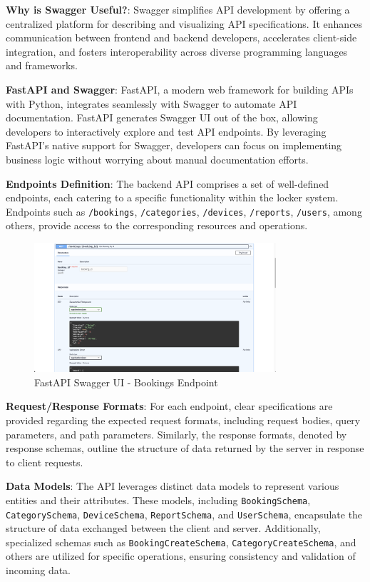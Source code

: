 \textbf{Why is Swagger Useful?}:
Swagger simplifies API development by offering a centralized platform for describing and visualizing API specifications. It enhances communication between frontend and backend developers, accelerates client-side integration, and fosters interoperability across diverse programming languages and frameworks.

\textbf{FastAPI and Swagger}:
FastAPI, a modern web framework for building APIs with Python, integrates seamlessly with Swagger to automate API documentation. FastAPI generates Swagger UI out of the box, allowing developers to interactively explore and test API endpoints. By leveraging FastAPI's native support for Swagger, developers can focus on implementing business logic without worrying about manual documentation efforts.

\textbf{Endpoints Definition}:
The backend API comprises a set of well-defined endpoints, each catering to a specific functionality within the locker system. Endpoints such as \texttt{/bookings}, \texttt{/categories}, \texttt{/devices}, \texttt{/reports}, \texttt{/users}, among others, provide access to the corresponding resources and operations.

\begin{figure}[h]
    \centering
    \includegraphics[width=0.8\textwidth]{images/swagger_ui_bookings}
    \caption{FastAPI Swagger UI - Bookings Endpoint}
    \label{fig:swagger_ui_bookings}
\end{figure}

\textbf{Request/Response Formats}:
For each endpoint, clear specifications are provided regarding the expected request formats, including request bodies, query parameters, and path parameters. Similarly, the response formats, denoted by response schemas, outline the structure of data returned by the server in response to client requests.

\textbf{Data Models}:
The API leverages distinct data models to represent various entities and their attributes. These models, including \texttt{BookingSchema}, \texttt{CategorySchema}, \texttt{DeviceSchema}, \texttt{ReportSchema}, and \texttt{UserSchema}, encapsulate the structure of data exchanged between the client and server. Additionally, specialized schemas such as \texttt{BookingCreateSchema}, \texttt{CategoryCreateSchema}, and others are utilized for specific operations, ensuring consistency and validation of incoming data.

